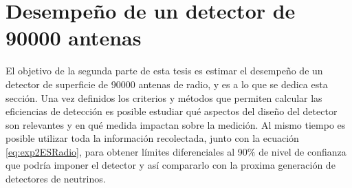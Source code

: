 



% 
% 	

	
\section{Desempe\~no de un detector de 90000 antenas}
	
	El objetivo de la segunda parte de esta tesis es estimar el desempe\~no de un detector de superficie de 90000 antenas de radio, y es a lo que se dedica esta secci\'on.
	Una vez definidos los criterios y m\'etodos que permiten calcular las eficiencias de detecci\'on es posible estudiar qu\'e aspectos del dise\~no del detector son relevantes y en qu\'e medida impactan sobre la medici\'on.
	Al mismo tiempo es posible utilizar toda la informaci\'on recolectada, junto con la ecuaci\'on \ref{eq:exp2ESRadio}, para obtener l\'imites diferenciales al 90$\%$ de nivel de confianza que podr\'ia imponer el detector y as\'i compararlo con la proxima generaci\'on de detectores de neutrinos.
	
